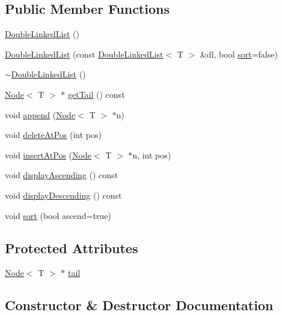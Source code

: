 \subsection*{Public Member Functions}
\begin{DoxyCompactItemize}
\item 
\hyperlink{classDoubleLinkedList_a597668999f971b0ceab3809daa094dab}{Double\+Linked\+List} ()
\item 
\hyperlink{classDoubleLinkedList_a369216eb49cf73fdc0aba61f0cc23785}{Double\+Linked\+List} (const \hyperlink{classDoubleLinkedList}{Double\+Linked\+List}$<$ T $>$ \&dl, bool \hyperlink{classDoubleLinkedList_aaaf8f24ea7fa8c66165d09015510b897}{sort}=false)
\item 
\hyperlink{classDoubleLinkedList_a1899a5f1dd799983930746331d77ebb7}{$\sim$\+Double\+Linked\+List} ()
\item 
\hyperlink{classNode}{Node}$<$ T $>$ $\ast$ \hyperlink{classDoubleLinkedList_a7b2e49b86ff5ebeb941e64f76c6a0d4c}{get\+Tail} () const 
\item 
void \hyperlink{classDoubleLinkedList_a5732ebaac8186c9847363c2569a1bf49}{append} (\hyperlink{classNode}{Node}$<$ T $>$ $\ast$n)
\item 
void \hyperlink{classDoubleLinkedList_a13520ddb52ec28efe42b5c29e9ba27e0}{delete\+At\+Pos} (int pos)
\item 
void \hyperlink{classDoubleLinkedList_abd88472eeb1c4904b9e92d712e652d45}{insert\+At\+Pos} (\hyperlink{classNode}{Node}$<$ T $>$ $\ast$n, int pos)
\item 
void \hyperlink{classDoubleLinkedList_a2103b34aa303947d86b063747701407b}{display\+Ascending} () const 
\item 
void \hyperlink{classDoubleLinkedList_ab426868e7e51cd082ff2fd5c3cb3eee3}{display\+Descending} () const 
\item 
void \hyperlink{classDoubleLinkedList_aaaf8f24ea7fa8c66165d09015510b897}{sort} (bool ascend=true)
\end{DoxyCompactItemize}
\subsection*{Protected Attributes}
\begin{DoxyCompactItemize}
\item 
\hyperlink{classNode}{Node}$<$ T $>$ $\ast$ \hyperlink{classDoubleLinkedList_aa9a7bf7a1c989e7a49781ac62d49982c}{tail}
\end{DoxyCompactItemize}


\subsection{Constructor \& Destructor Documentation}
